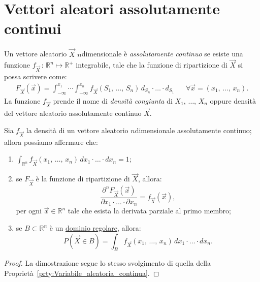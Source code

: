     \section{Vettori aleatori assolutamente continui}
        \begin{defn}\label{defn:Vettori_aleatori_assolutamente_continui}
            Un vettore aleatorio $\vec{X}$ $n$\nbdash dimensionale è \textit{assolutamente continuo} se esiste una funzione $f_{\vec{X}}\,:\, \mathbb{R}^n \mapsto \mathbb{R}^+$ integrabile, tale che la funzione di ripartizione di $\vec{X}$ si possa scrivere come:
            \begin{align*}
                F_{\vec{X}}(\vec{x}) = \int_{-\infty}^{x_1} \dotsi 
                \int_{-\infty}^{x_n} f_{\vec{X}}(S_1,\, \ldots,\, S_{n})\, d_{S_n} \cdot \ldots \cdot d_{S_1} 
                & & \forall \vec{x} = (x_1,\, \ldots,\, x_{n})
            .\end{align*}
            La funzione $f_{\vec{X}}$ prende il nome di \textit{densità congiunta} di $X_1,\, \ldots,\, X_{n}$ oppure densità del vettore aleatorio assolutamente continuo $\vec{X}$.
        \end{defn}
        \begin{prty}\label{prty:Vettori_aleatori_assolutamente_continui}
            Sia $f_{\vec{X}}$ la densità di un vettore aleatorio $n$\nbdash dimensionale assolutamente continuo; allora possiamo affermare che:
            \begin{enumerate}
                \item $\int_{\mathbb{R}^n} f_{\vec{X}}(x_1,\, \ldots,\, x_{n})\, dx_1 \cdot \ldots \cdot dx_n = 1$;
                \item se  $F_{\vec{X}}$ è la funzione di ripartizione di $\vec{X}$, allora: \[
                    \frac{\partial^n F_{\vec{X}}(\vec{x})}{\partial x_1 \cdot \ldots \cdot \partial x_{n}} = f_{\vec{X}}(\vec{x})
                ,\] per ogni $\vec{x} \in \mathbb{R}^n$ tale che esista la derivata parziale al primo membro;
                \item se $B \subset \mathbb{R}^n$ è un \underline{dominio regolare}, allora: \[
                        P(\vec{X} \in B) = \int_{B} f_{\vec{X}}(x_1,\, \ldots,\, x_{n})\, dx_1 \cdot \ldots \cdot dx_n
                .\] 
            \end{enumerate}
        \end{prty}
        \begin{proof}
            La dimostrazione segue lo stesso svolgimento di quella della Proprietà~\ref{prty:Variabile_aleatoria_continua}.
        \end{proof}
